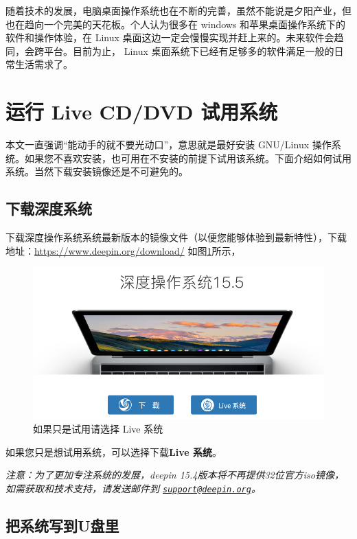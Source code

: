 \documentclass[doctor,openright,twoside]{sjtuthesis}
\theoremstyle{plain}
\theoremstyle{definition}
\theoremstyle{remark}
\theoremstyle{ocrenumbox}
\theoremstyle{plain}
\newcommand\cqh{“}
\newcommand\cqt{”}
\begin{document}
随着技术的发展，电脑桌面操作系统也在不断的完善，虽然不能说是夕阳产业，但也在趋向一个完美的天花板。个人认为很多在
windows 和苹果桌面操作系统下的软件和操作体验，在 Linux
桌面这边一定会慢慢实现并赶上来的。未来软件会趋同，会跨平台。目前为止，
Linux 桌面系统下已经有足够多的软件满足一般的日常生活需求了。

\hypertarget{-live-cddvd-}{%
\section{运行 Live CD/DVD 试用系统}\label{-live-cddvd-}}

本文一直强调\cqh 能动手的就不要光动口\cqt ，意思就是最好安装 GNU/Linux
操作系统。如果您不喜欢安装，也可用在不安装的前提下试用该系统。下面介绍如何试用系统。当然下载安装镜像还是不可避免的。

\subsection{下载深度系统}

下载深度操作系统系统最新版本的镜像文件（以便您能够体验到最新特性），下载地址：\url{https://www.deepin.org/download/}
如图\ref{fig:livecd}所示，

\begin{figure}
\includegraphics{linux-desktop-live} \caption[如果只是试用请选择 Live 系统]{如果只是试用请选择 Live 系统}\label{fig:livecd}
\end{figure}

如果您只是想试用系统，可以选择下载\textbf{Live 系统}。

\emph{注意：为了更加专注系统的发展，deepin
15.4版本将不再提供32位官方iso镜像，如需获取和技术支持，请发送邮件到
\href{mailto:support@deepin.org}{\nolinkurl{support@deepin.org}}。}

\hypertarget{u}{%
\subsection{把系统写到U盘里}\label{u}}
\end{document}
